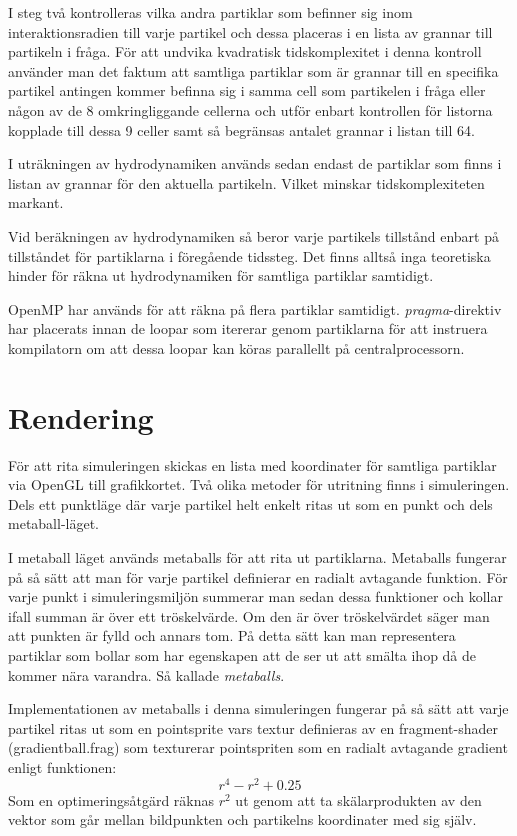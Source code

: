 \documentclass[a4paper,12pt,oneside,final]{extarticle}
\begin{document}
I steg två kontrolleras vilka andra partiklar som befinner sig inom interaktionsradien till varje partikel och dessa placeras i en lista av grannar till partikeln i fråga.
För att undvika kvadratisk tidskomplexitet i denna kontroll använder man det faktum att samtliga partiklar som är grannar till en specifika partikel antingen kommer befinna sig i samma cell som partikelen i fråga eller någon av de 8 omkringliggande cellerna och utför enbart kontrollen för listorna kopplade till dessa 9 celler samt så begränsas antalet grannar i listan till 64.

I uträkningen av hydrodynamiken används sedan endast de partiklar som finns i listan av grannar för den aktuella partikeln.
Vilket minskar tidskomplexiteten markant.

Vid beräkningen av hydrodynamiken så beror varje partikels tillstånd enbart på tillståndet för partiklarna i föregående tidssteg.
Det finns alltså inga teoretiska hinder för räkna ut hydrodynamiken för samtliga partiklar samtidigt.

OpenMP \cite{openmp} har används för att räkna på flera partiklar samtidigt.
\textit{pragma}-direktiv har placerats innan de loopar som itererar genom partiklarna för att instruera kompilatorn om att dessa loopar kan köras parallellt på centralprocessorn.

\section{Rendering}
För att rita simuleringen skickas en lista med koordinater för samtliga partiklar via OpenGL till grafikkortet.
Två olika metoder för utritning finns i simuleringen.
Dels ett punktläge där varje partikel helt enkelt ritas ut som en punkt och dels metaball-läget.

I metaball läget används metaballs för att rita ut partiklarna.
Metaballs fungerar på så sätt att man för varje partikel definierar en radialt avtagande funktion.
För varje punkt i simuleringsmiljön summerar man sedan dessa funktioner och kollar ifall summan är över ett tröskelvärde.
Om den är över tröskelvärdet säger man att punkten är fylld och annars tom.
På detta sätt kan man representera partiklar som bollar som har egenskapen att de ser ut att smälta ihop då de kommer nära varandra.
Så kallade \textit{metaballs}.

Implementationen av metaballs i denna simuleringen fungerar på så sätt att varje partikel ritas ut som en pointsprite vars textur definieras av en fragment-shader (gradientball.frag) som texturerar pointspriten som en radialt avtagande gradient enligt funktionen:
\begin{equation}
r^{4} -r^{2} + 0.25
\end{equation}
Som en optimeringsåtgärd räknas $ r^{2} $ ut genom att ta skälarprodukten av den vektor som går mellan bildpunkten och partikelns koordinater med sig själv.
\end{document}
